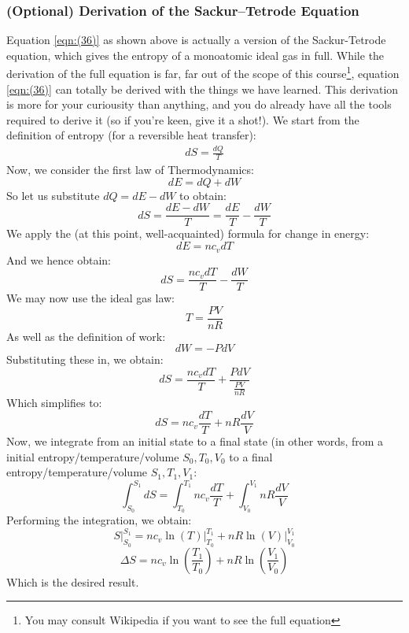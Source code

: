 \subsubsection{(Optional) Derivation of the Sackur–Tetrode Equation}
Equation \ref{eqn:(36)} as shown above is actually a version of the Sackur-Tetrode equation, which gives the entropy of a monoatomic ideal gas in full. While the derivation of the full equation is far, far out of the scope of this course\footnote{You may consult Wikipedia if you want to see the full equation}, equation \ref{eqn:(36)} can totally be derived with the things we have learned. This derivation is more for your curiousity than anything, and you do already have all the tools required to derive it (so if you're keen, give it a shot!). We start from the definition of entropy (for a reversible heat transfer):
\begin{align*}
    dS = \frac{dQ}{T}
\end{align*}
Now, we consider the first law of Thermodynamics:
\[
    dE = dQ+dW
\]
So let us substitute $dQ = dE-dW$ to obtain:
\[ dS = \frac{dE-dW}{T} = \frac{dE}{T}-\frac{dW}{T}
\]
We apply the (at this point, well-acquainted) formula for change in energy:
\[dE = nc_vdT \]
And we hence obtain:
\[ dS = \frac{nc_vdT}{T} - \frac{dW}{T} \]
We may now use the ideal gas law:
\[T = \frac{PV}{nR} \]
As well as the definition of work:
\[dW = -PdV \]
Substituting these in, we obtain:
\[ dS = \frac{nc_vdT}{T} + \frac{PdV}{\frac{PV}{nR}}\]
Which simplifies to:
\[dS = nc_v\frac{dT}{T} + nR\frac{dV}{V} \]
Now, we integrate from an initial state to a final state (in other words, from a initial entropy/temperature/volume $S_0,T_0,V_0$ to a final entropy/temperature/volume $S_1,T_1,V_1$:
\[\int_{S_0}^{S_1} dS = \int_{T_0}^{T_1}nc_v\frac{dT}{T} + \int_{V_0}^{V_1}nR\frac{dV}{V} \]
Performing the integration, we obtain:
\[ \left.S \right|_{S_0}^{S_1} = nc_v \left. \ln(T) \right|_{T_0}^{T_1} + nR \left. \ln(V) \right|_{V_0}^{V_1} \]
\[ \Delta S = nc_v\ln\left(\frac{T_1}{T_0}\right) + nR \ln\left(\frac{V_1}{V_0}\right) \]
Which is the desired result. 